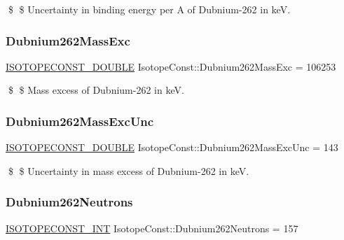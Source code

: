 \$ \$ Uncertainty in binding energy per A of Dubnium-\/262 in keV. \mbox{\label{group___isotope_const-_dubnium-_db262_ga503b95cf2dfbd4dc53931e3b8feeb6e8}} 
\subsubsection{\texorpdfstring{Dubnium262\+Mass\+Exc}{Dubnium262MassExc}}
{\footnotesize\ttfamily \mbox{\hyperlink{group___isotope_const-_macros_ga8f45a7272ce02c0b4c65c44636ed719a}{I\+S\+O\+T\+O\+P\+E\+C\+O\+N\+S\+T\+\_\+\+D\+O\+U\+B\+LE}} Isotope\+Const\+::\+Dubnium262\+Mass\+Exc = 106253}

\$ \$ Mass excess of Dubnium-\/262 in keV. \mbox{\label{group___isotope_const-_dubnium-_db262_gad486619ecd67f39cda9f7f7c8ec97a62}} 
\subsubsection{\texorpdfstring{Dubnium262\+Mass\+Exc\+Unc}{Dubnium262MassExcUnc}}
{\footnotesize\ttfamily \mbox{\hyperlink{group___isotope_const-_macros_ga8f45a7272ce02c0b4c65c44636ed719a}{I\+S\+O\+T\+O\+P\+E\+C\+O\+N\+S\+T\+\_\+\+D\+O\+U\+B\+LE}} Isotope\+Const\+::\+Dubnium262\+Mass\+Exc\+Unc = 143}

\$ \$ Uncertainty in mass excess of Dubnium-\/262 in keV. \mbox{\label{group___isotope_const-_dubnium-_db262_gae5f14b089471cea45574186f4662641f}} 
\subsubsection{\texorpdfstring{Dubnium262\+Neutrons}{Dubnium262Neutrons}}
{\footnotesize\ttfamily \mbox{\hyperlink{group___isotope_const-_macros_ga5f18360b3e99483a35c32d789e62621c}{I\+S\+O\+T\+O\+P\+E\+C\+O\+N\+S\+T\+\_\+\+I\+NT}} Isotope\+Const\+::\+Dubnium262\+Neutrons = 157}

